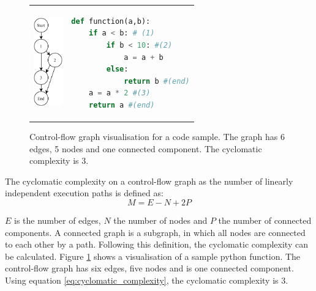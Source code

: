 \begin{figure}
\begin{tabular}{p{}p{}}
    \begin{minipage}{0.45\textwidth}
        \centering
    \includegraphics[height=1.5in]{img/Background/control-flow-graph.pdf}
    \label{fig:background_control_flow_graph_image}
    \end{minipage}
&
\begin{minipage}[c]{0.45\textwidth}
\centering
\begin{lstlisting}[language=Python, label=lst:background_control_flow_graph_listing]
def function(a,b):
    if a < b: # (1)
        if b < 10: #(2)
            a = a + b
        else:
            return b #(end)
    a = a * 2 #(3)
    return a #(end)
\end{lstlisting}
\end{minipage}
\end{tabular}
\caption[Control-flow graph visualisation for a code sample]{Control-flow graph visualisation for a code sample. The graph has 6 edges, 5 nodes and one connected component. The cyclomatic complexity is 3. }
\label{fig:background_control_flow_graph}
\end{figure}

The cyclomatic complexity on a control-flow graph as the number of linearly independent execution paths is defined as:
\begin{equation}\label{eq:cyclomatic_complexity}
M = E - N + 2P
\end{equation}

$E$ is the number of edges, $N$ the number of nodes and $P$ the number of connected components.  A connected graph is a subgraph, in which all nodes are connected to each other by a path. Following this definition, the cyclomatic complexity can be calculated. Figure \ref{fig:background_control_flow_graph} shows a visualisation of a sample python function. The control-flow graph has six edges, five nodes and is one connected component. Using equation \ref{eq:cyclomatic_complexity}, the cyclomatic complexity is 3.

